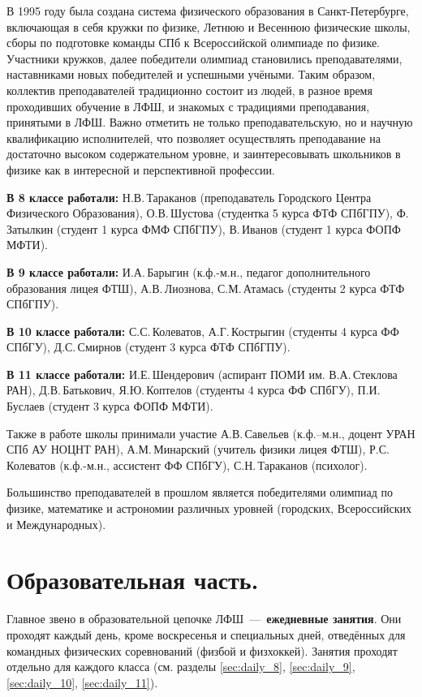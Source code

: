 \documentclass[12pt,a4paper,oneside,draft]{scrartcl}
\newlength{\h}
\newlength{\x}
\begin{document}
В 1995 году была создана система физического образования в
Санкт-Петербурге, включающая в себя кружки по физике, Летнюю и
Весеннюю физические школы, сборы по подготовке команды СПб к
Всероссийской олимпиаде по физике. Участники кружков, далее победители
олимпиад становились преподавателями, наставниками новых победителей и
успешными учёными. Таким образом, коллектив преподавателей традиционно
состоит из людей, в разное время проходивших обучение в ЛФШ, и
знакомых с традициями преподавания, принятыми в ЛФШ. Важно отметить не
только преподавательскую, но и научную квалификацию исполнителей, что
позволяет осуществлять преподавание на достаточно высоком
содержательном уровне, и заинтересовывать школьников в физике как в
интересной и перспективной профессии.

\textbf{В 8 классе работали:} Н.В.\,Тараканов (преподаватель Городского Центра
Физического Образования), О.В.\,Шустова (студентка 5 курса ФТФ СПбГПУ),
Ф.\,Затылкин (студент 1 курса ФМФ СПбГПУ), В.\,Иванов (студент 1 курса
ФОПФ МФТИ).

\textbf{В 9 классе работали:} И.А.\,Барыгин (к.ф.-м.н., педагог дополнительного
образования лицея ФТШ), А.В.\,Лиознова, С.М.\,Атамась (студенты 2 курса
ФТФ СПбГПУ).

\textbf{В 10 классе работали:} С.С.\,Колеватов, А.Г.\,Кострыгин (студенты 4
курса ФФ СПбГУ), Д.С.\,Смирнов (студент 3 курса ФТФ СПбГПУ).

\textbf{В 11 классе работали:} И.Е.\,Шендерович (аспирант ПОМИ
им. В.А.\,Стеклова РАН), Д.В.\,Батькович, Я.Ю.\,Коптелов (студенты 4 курса
ФФ СПбГУ), П.И.\,Буслаев (студент 3 курса ФОПФ МФТИ).

Также в работе школы принимали участие А.В.\,Савельев (к.ф.–м.н.,
доцент УРАН СПб АУ НОЦНТ РАН), А.М.\,Минарский (учитель физики лицея
ФТШ), Р.С.\,Колеватов (к.ф.-м.н., ассистент ФФ СПбГУ), С.Н.\,Тараканов
(психолог).

Большинство преподавателей в прошлом является победителями олимпиад по
физике, математике и астрономии различных уровней (городских,
Всероссийских и Международных).

\section{Образовательная часть.}
\label{sec:science}

Главное звено в образовательной цепочке ЛФШ~---~\textbf{ежедневные
занятия}. Они проходят каждый день, кроме воскресенья и специальных
дней, отведённых для командных физических соревнований (физбой и
физхоккей). Занятия проходят отдельно для каждого класса
(см. разделы \ref{sec:daily_8}, \ref{sec:daily_9}, \ref{sec:daily_10},
\ref{sec:daily_11}). 
\end{document}
